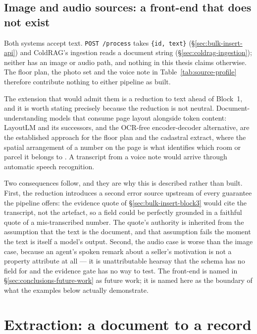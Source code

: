 \subsection{Image and audio sources: a front-end that does not exist}
\label{sec:examples-multimodal}

Both systems accept text. \texttt{POST /process} takes \texttt{\{id, text\}} (\S\ref{sec:bulk-insert-api}) and ColdRAG's ingestion reads a document string (\S\ref{sec:coldrag-ingestion}); neither has an image or audio path, and nothing in this thesis claims otherwise. The floor plan, the photo set and the voice note in Table~\ref{tab:source-profile} therefore contribute nothing to either pipeline as built.

The extension that would admit them is a reduction to text ahead of Block~1, and it is worth stating precisely because the reduction is not neutral. Document-understanding models that consume page layout alongside token content: LayoutLM and its successors, and the OCR-free encoder-decoder alternative, are the established approach for the floor plan and the cadastral extract, where the spatial arrangement of a number on the page is what identifies which room or parcel it belongs to \citep{xu2020layoutlm,huang2022layoutlmv3,kim2022ocr}. A transcript from a voice note would arrive through automatic speech recognition.

Two consequences follow, and they are why this is described rather than built. First, the reduction introduces a second error source upstream of every guarantee the pipeline offers: the evidence quote of \S\ref{sec:bulk-insert-block3} would cite the transcript, not the artefact, so a field could be perfectly grounded in a faithful quote of a mis-transcribed number. The quote's authority is inherited from the assumption that the text is the document, and that assumption fails the moment the text is itself a model's output. Second, the audio case is worse than the image case, because an agent's spoken remark about a seller's motivation is not a property attribute at all --- it is unattributable hearsay that the schema has no field for and the evidence gate has no way to test. The front-end is named in \S\ref{sec:conclusions-future-work} as future work; it is named here as the boundary of what the examples below actually demonstrate.


\section{Extraction: a document to a record}
\label{sec:examples-extraction}

